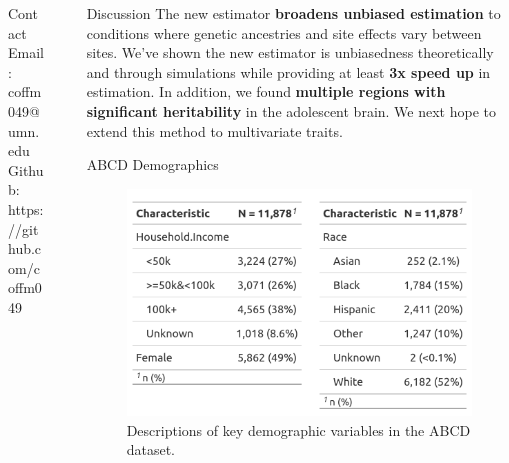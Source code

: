 \documentclass[final]{beamer}
\newlength{\sepwid}
\newlength{\onecolwid}
\newlength{\twocolwid}
\begin{document}
\begin{frame}[t]
\begin{columns}[t]
\begin{column}{\twocolwid}
\begin{alertblock}{Contact}
Email: coffm049@umn.edu \\
Github: https://github.com/coffm049
\end{alertblock}


\end{column} %
\begin{column}{\sepwid}\end{column} %
\begin{column}{\onecolwid} %
\begin{block}{Discussion}
	The new estimator \textbf{broadens unbiased estimation} to conditions where genetic ancestries and site effects vary between sites. We've shown the new estimator is unbiasedness theoretically and through simulations while providing at least \textbf{3x speed up} in estimation. In addition, we found \textbf{multiple regions with significant heritability} in the adolescent brain. We next hope to extend this method to multivariate traits.
\end{block}

\vspace{3cm}

\begin{block}{ABCD Demographics}
\begin{figure}
    \centering
    \includegraphics[width = 1\textwidth]{Graphics/Table1.png}
    \caption{Descriptions of key demographic variables in the ABCD dataset.
}
    \label{tab:table}
\end{figure}
\end{block}




\end{column}
\end{columns}
\end{frame}
\end{document}
